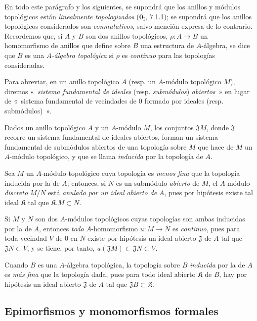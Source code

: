 \begin{env}[19.0.3]
\label{0.19.0.3-fr}
En todo este parágrafo y los siguientes, se supondrá que los anillos y módulos topológicos
están \emph{linealmente topologizados} ($\mathbf{0}_{\mathrm I}$,
7.1.1); se supondrá que los anillos topológicos considerados son \emph{conmutativos},
salvo mención expresa de lo contrario. Recordemos que, si $A$ y $B$ son dos
anillos topológicos, $\rho:A\to B$ un homomorfismo de anillos que define sobre
$B$ una estructura de $A$-álgebra, se dice que $B$ es una \emph{$A$-álgebra
topológica} si $\rho$ es \emph{continuo} para las topologías consideradas.

Para abreviar, en un anillo topológico $A$ (resp. un $A$-módulo topológico
$M$), diremos «~\emph{sistema fundamental de ideales} (resp.
\emph{submódulos}) \emph{abiertos}~» en lugar de «~sistema fundamental de
vecindades de 0 formado por ideales (resp. submódulos)~».

Dados un anillo topológico $A$ y un $A$-módulo $M$, los conjuntos
$\mathfrak J M$, donde $\mathfrak J$ recorre un sistema fundamental de ideales
abiertos, forman un sistema fundamental de submódulos abiertos de una topología
sobre $M$ que hace de $M$ un $A$-módulo topológico, y que se llama \emph{inducida}
por la topología de $A$.

Sea $M$ un $A$-módulo topológico cuya topología es \emph{menos fina} que
la topología inducida por la de $A$; entonces, si $N$ es un submódulo
\emph{abierto} de $M$, el $A$-módulo \emph{discreto} $M/N$ está \emph{anulado por
un ideal abierto de} $A$, pues por hipótesis existe tal ideal $\mathfrak K$
tal que $\mathfrak K.M\subset N$.


Si $M$ y $N$ son dos $A$-módulos topológicos cuyas topologías son ambas
inducidas por la de $A$, entonces \emph{todo} $A$-homomorfismo $u:M\to N$
es \emph{continuo}, pues para toda vecindad $V$ de 0 en $N$ existe por
hipótesis un ideal abierto $\mathfrak J$ de $A$ tal que $\mathfrak JN\subset V$,
y se tiene, por tanto, $u(\mathfrak JM)\subset\mathfrak JN\subset V$.

Cuando $B$ es una $A$-álgebra topológica, la topología sobre $B$ \emph{inducida}
por la de $A$ es \emph{más fina} que la topología dada, pues para todo
ideal abierto $\mathfrak K$ de $B$, hay por hipótesis un ideal abierto
$\mathfrak J$ de $A$ tal que $\mathfrak JB\subset\mathfrak K$.
\end{env}

\subsection{Epimorfismos y monomorfismos formales}
\label{subsection:0.19.1-fr}

